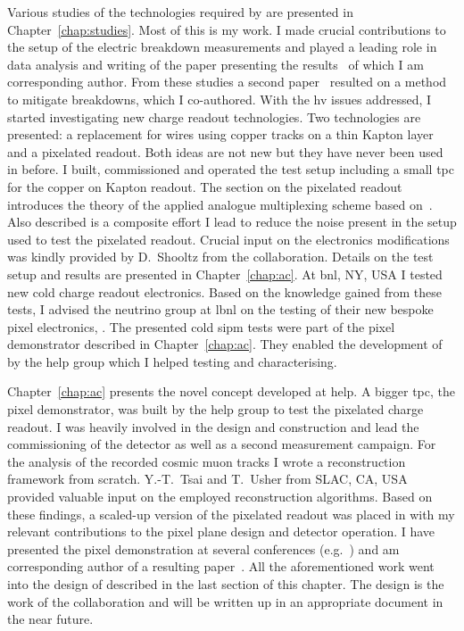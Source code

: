 Various studies of the technologies required by \AC{} are presented in Chapter~\ref{chap:studies}.
Most of this is my work.
I made crucial contributions to the setup of the electric breakdown measurements and played a leading role in data analysis and writing of the paper presenting the results~\cite{breakdown_16} of which I am corresponding author.
From these studies a second paper~\cite{latex} resulted on a method to mitigate breakdowns, which I co-authored.
With the \gls{hv} issues addressed, I started investigating new charge readout technologies.
Two technologies are presented: a replacement for wires using copper tracks on a thin Kapton layer and a pixelated readout.
Both ideas are not new but they have never been used in \lar{} before.
I built, commissioned and operated the test setup including a small \gls{tpc} for the copper on Kapton readout.
The section on the pixelated readout introduces the theory of the applied analogue multiplexing scheme based on~\cite{maplesyrup}.
Also described is a composite effort I lead to reduce the noise present in the setup used to test the pixelated readout.
Crucial input on the electronics modifications was kindly provided by D.\ Shooltz from the \lariat{} collaboration.
Details on the test setup and results are presented in Chapter~\ref{chap:ac}.
At \gls{bnl}, NY, USA I tested new cold charge readout electronics.
Based on the knowledge gained from these tests, I advised the neutrino group at \gls{lbnl} on the testing of their new bespoke pixel electronics, \larpix{}.
The presented cold \gls{sipm} tests were part of the pixel demonstrator described in Chapter~\ref{chap:ac}.
They enabled the development of \AL{}~\cite{arclight} by the \gls{help} \lar{} group which I helped testing and characterising.

Chapter~\ref{chap:ac} presents the novel \AC{} \lartpc{} concept developed at \gls{help}.
A bigger \gls{tpc}, the pixel demonstrator, was built by the \gls{help} \lar{} group to test the pixelated charge readout.
I was heavily involved in the design and construction and lead the commissioning of the detector as well as a second measurement campaign.
For the analysis of the recorded cosmic muon tracks I wrote a reconstruction framework from scratch.
Y.-T.\ Tsai and T.\ Usher from SLAC, CA, USA provided valuable input on the employed reconstruction algorithms.
Based on these findings, a scaled-up version of the pixelated readout was placed in \lariat{} with my relevant contributions to the pixel plane design and detector operation.
I have presented the pixel demonstration at several conferences (e.g.~\cite{pixel_proceedings}) and am corresponding author of a resulting paper~\cite{pixel_paper}.
All the aforementioned work went into the design of \AC{} described in the last section of this chapter.
The design is the work of the \AC{} collaboration and will be written up in an appropriate document in the near future.

